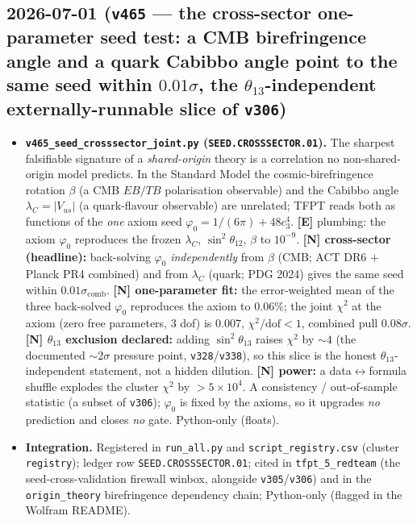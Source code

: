 \subsection*{2026-07-01 (\texttt{v465} --- the cross-sector one-parameter seed test: a CMB birefringence angle and a quark Cabibbo angle point to the same seed within $0.01\sigma$, the $\theta_{13}$-independent externally-runnable slice of \texttt{v306})}
\begin{itemize}
\item \textbf{\texttt{v465\_seed\_crosssector\_joint.py} (\texttt{SEED.CROSSSECTOR.01}).} The sharpest
falsifiable signature of a \emph{shared-origin} theory is a correlation no non-shared-origin model
predicts. In the Standard Model the cosmic-birefringence rotation $\beta$ (a CMB $EB/TB$ polarisation
observable) and the Cabibbo angle $\lambda_C{=}|V_{us}|$ (a quark-flavour observable) are unrelated;
TFPT reads both as functions of the \emph{one} axiom seed $\varphi_0{=}1/(6\pi){+}48c_3^4$.
\textbf{[E]} plumbing: the axiom $\varphi_0$ reproduces the frozen $\lambda_C$, $\sin^2\theta_{12}$,
$\beta$ to $10^{-9}$. \textbf{[N] cross-sector (headline):} back-solving $\varphi_0$ \emph{independently}
from $\beta$ (CMB; ACT DR6 $+$ Planck PR4 combined) and from $\lambda_C$ (quark; PDG 2024) gives the
same seed within $0.01\sigma_{\mathrm{comb}}$. \textbf{[N] one-parameter fit:} the error-weighted mean
of the three back-solved $\varphi_0$ reproduces the axiom to $0.06\%$; the joint $\chi^2$ at the axiom
(zero free parameters, $3$ dof) is $0.007$, $\chi^2/\mathrm{dof}{<}1$, combined pull $0.08\sigma$.
\textbf{[N] $\theta_{13}$ exclusion declared:} adding $\sin^2\theta_{13}$ raises $\chi^2$ by ${\sim}4$
(the documented ${\sim}2\sigma$ pressure point, \texttt{v328}/\texttt{v338}), so this slice is the honest
$\theta_{13}$-independent statement, not a hidden dilution. \textbf{[N] power:} a data$\leftrightarrow$formula
shuffle explodes the cluster $\chi^2$ by ${>}5{\times}10^4$. A consistency / out-of-sample statistic
(a subset of \texttt{v306}); $\varphi_0$ is fixed by the axioms, so it upgrades \emph{no} prediction and
closes \emph{no} gate. Python-only (floats).
\item \textbf{Integration.} Registered in \texttt{run\_all.py} and \texttt{script\_registry.csv}
(cluster \texttt{registry}); ledger row \texttt{SEED.CROSSSECTOR.01}; cited in \texttt{tfpt\_5\_redteam}
(the seed-cross-validation firewall winbox, alongside \texttt{v305}/\texttt{v306}) and in the
\texttt{origin\_theory} birefringence dependency chain; Python-only (flagged in the Wolfram README).
\end{itemize}

